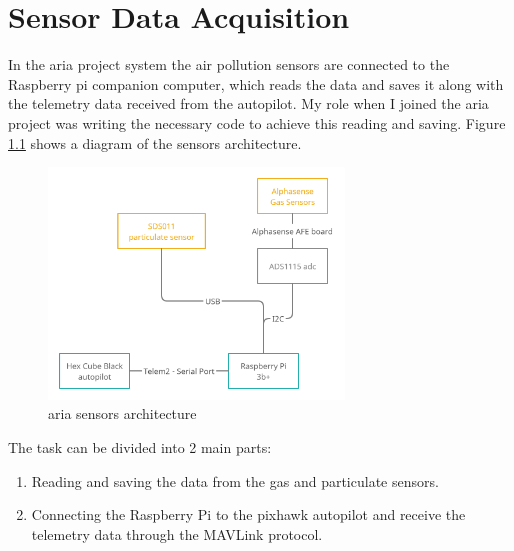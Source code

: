 \chapter{Sensor Data Acquisition}
In the \gls{aria} project system the air pollution sensors are connected to the Raspberry pi companion computer, which reads the data and saves it along with the telemetry data received from the autopilot. My role when I joined the \gls{aria} project was writing the necessary code to achieve this reading and saving.
Figure \ref{fig:sensor-diagram} shows a diagram of the sensors architecture.
\begin{figure}[H]
    \centering
    \includegraphics[width=0.7\textwidth]{images/sensor-diagram.png}
    \caption{\gls{aria} sensors architecture}
    \label{fig:sensor-diagram}
\end{figure}
The task can be divided into 2 main parts:
\begin{enumerate}
    \item Reading and saving the data from the gas and particulate sensors.
    \item Connecting the Raspberry Pi to the pixhawk autopilot and receive the telemetry data through the MAVLink protocol.
\end{enumerate}
